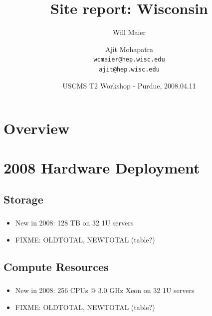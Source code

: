 \documentclass{beamer}
\title{Site report: Wisconsin}
\author[Maier, Mohapatra]{
    Will Maier \and Ajit Mohapatra\\ 
    {\tt wcmaier@hep.wisc.edu}\\
    {\tt ajit@hep.wisc.edu}}
\institute[Wisconsin]{University of Wisconsin - High Energy Physics}
\date[2008.04.11]{USCMS T2 Workshop - Purdue, 2008.04.11}
\begin{document}
%
%
%


\begin{frame}
    \titlepage
\end{frame}

\section{Overview}
\begin{frame}
    \tableofcontents
\end{frame}

\section{2008 Hardware Deployment}
\subsection{Storage}
\begin{frame}
\frametitle{}
\begin{itemize}
    \item New in 2008: 128 TB on 32 1U servers
    \item FIXME: OLDTOTAL, NEWTOTAL (table?)
\end{itemize}
\end{frame}

\subsection{Compute Resources}
\begin{frame}
\frametitle{}
\begin{itemize}
    \item New in 2008: 256 CPUs @ 3.0 GHz Xeon on 32 1U servers
    \item FIXME: OLDTOTAL, NEWTOTAL (table?)
\end{itemize}
\end{frame}
\end{document}
